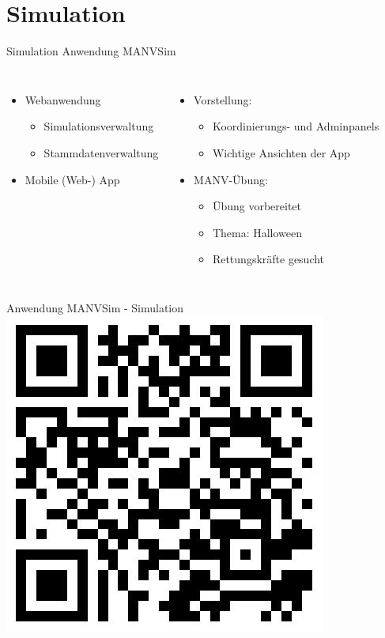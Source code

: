 
\section{Simulation}

\begin{frame}{Simulation}
	Anwendung MANVSim
	\begin{columns}
		\begin{itemize}
			\item Webanwendung
			\begin{itemize}
				\item Simulationsverwaltung
				\item Stammdatenverwaltung
			\end{itemize}
			\item Mobile (Web-) App
		\end{itemize}
			\begin{itemize}
				\item Vorstellung:
				\begin{itemize}
					\item Koordinierungs- und Adminpanels
					\item Wichtige Ansichten der App
				\end{itemize}
				\item MANV-Übung:
				\begin{itemize}
					\item Übung vorbereitet
					\item Thema: Halloween
					\item Rettungskräfte gesucht
				\end{itemize}
			\end{itemize}
	\end{columns} 
\end{frame}

\begin{frame}{Anwendung MANVSim - Simulation}
	\centering
	\includegraphics[height=0.8\textheight]{images/qrcode.jpeg}
\end{frame}
